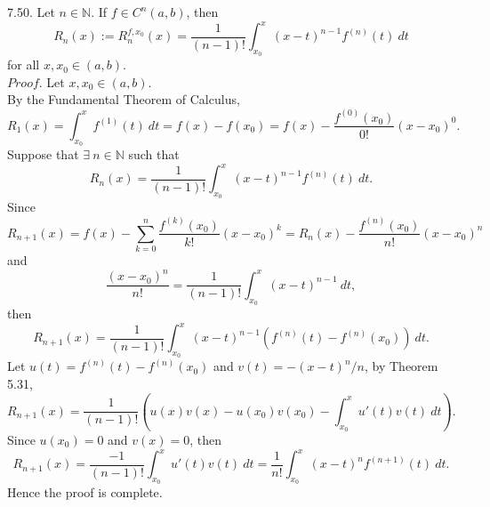 \documentclass[12pt]{book}
\begin{document}
\begin{CJK}{UTF8}{bsmi}
7.50. Let $n\in\mathbb{N}$. If $f\in C^n(a, b)$, then
\[
    R_n(x) := R_n^{f, x_0}(x)
    = \frac{1}{(n-1)!} \int_{x_0}^x (x-t)^{n-1} f^{(n)} (t)\ dt
\]
for all $x, x_0\in(a, b)$. \\
$Proof$. Let $x, x_0\in(a, b)$. \\
By the Fundamental Theorem of Calculus, 
\[
    R_1(x) 
    = \int_{x_0}^x f^{(1)} (t)\ dt
    = f(x) - f(x_0)
    = f(x) - \frac{f^{(0)}(x_0)}{0!} (x-x_0)^0.
\]
Suppose that $\exists\ n\in\mathbb{N}$ such that
\[
    R_n(x) 
    = \frac{1}{(n-1)!} \int_{x_0}^x (x-t)^{n-1} f^{(n)} (t)\ dt.
\]
Since 
\[
    R_{n+1}(x) 
    = f(x) - \sum_{k=0}^n \frac{f^{(k)}(x_0)}{k!} (x-x_0)^k
    = R_n(x) - \frac{f^{(n)}(x_0)}{n!} (x-x_0)^n
\]
and
\[
    \frac{(x-x_0)^n}{n!}
    = \frac{1}{(n-1)!} \int_{x_0}^x (x-t)^{n-1}\ dt,
\]
then
\[
    R_{n+1}(x) 
    = \frac{1}{(n-1)!} \int_{x_0}^x (x-t)^{n-1} \left( f^{(n)}(t)-f^{(n)}(x_0) \right)\ dt.
\]
Let $u(t) = f^{(n)}(t)-f^{(n)}(x_0)$ and $v(t) = -(x-t)^n/n$, by Theorem 5.31, 
\[
    R_{n+1}(x) 
    = \frac{1}{(n-1)!} \left( 
        u(x)v(x) - u(x_0)v(x_0) - \int_{x_0}^x u'(t) v(t)\ dt 
    \right).
\]
Since $u(x_0)=0$ and $v(x)=0$, then
\[
    R_{n+1}(x) 
    = \frac{-1}{(n-1)!} \int_{x_0}^x u'(t) v(t)\ dt 
    = \frac{1}{n!} \int_{x_0}^x (x-t)^{n} f^{(n+1)} (t)\ dt.
\]
Hence the proof is complete. \\

\end{CJK}
\end{document}

